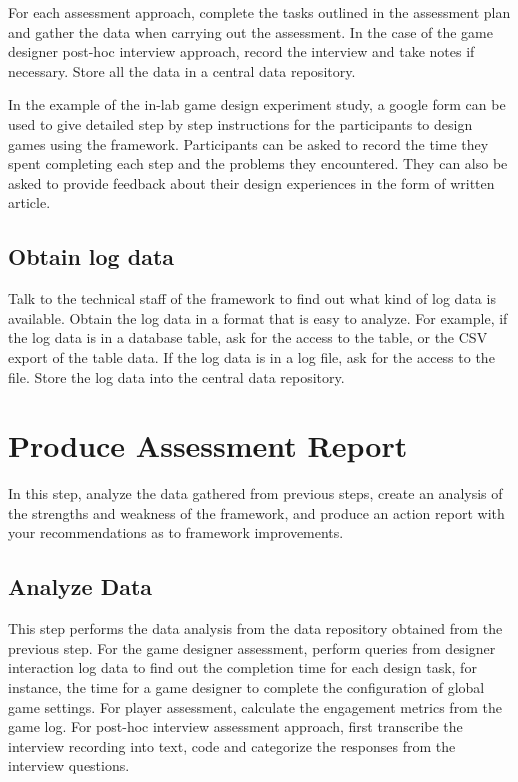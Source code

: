 For each assessment approach, complete the tasks outlined in the assessment plan and gather the data when carrying out the 
assessment. In the case of the game designer post-hoc interview approach, record the interview and take notes if necessary. 
Store all the data in a central data repository. 

In the example of the in-lab game design experiment study, a google form can be used  to give detailed step by step 
instructions for the participants to design games using the framework. Participants can be asked to record the time they spent completing 
each step and the problems they encountered. They can also be asked to provide feedback about their design experiences
in the form of written article. 

\subsection{Obtain log data}

Talk to the technical staff of the framework to find out what kind of log data is available. Obtain the log data in a format that 
is easy to analyze. For example, if the log data is in a database table, ask for the access to the table, or the CSV export of 
the table data. If the log data is in a log file, ask for the access to the file. Store the log data into the central data repository.

\section{Produce Assessment Report}

In this step, analyze the data gathered from previous steps,
create an analysis of the strengths and weakness of the framework, 
and produce an action report with your recommendations as to framework improvements.

\subsection{Analyze Data}

This step performs the data analysis from the data repository obtained from the previous step. For the game designer assessment, 
perform queries from designer interaction log data to find out the completion time for each design task, for instance, the 
time for a game designer to complete the configuration of global game settings. For player assessment, calculate the 
engagement metrics from the game log. For post-hoc interview assessment approach, first transcribe the interview recording into 
text, code and categorize the responses from the interview questions. 

